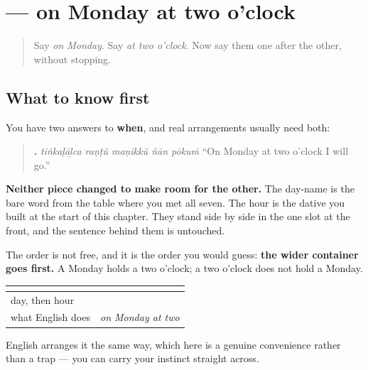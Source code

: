 \section[\texorpdfstring{\ml{തിങ്കളാഴ്ച} \ml{രണ്ട്} \ml{മണിക്ക്} (tiṅkaḷāḻca raṇṭŭ …)}{തിങ്കളാഴ്ച രണ്ട് മണിക്ക് (tiṅkaḷāḻca raṇṭŭ …)}]{   — on Monday at two o'clock}

\label{lesson:ML-C102-day-and-hour}



\begin{quote}
Say \emph{on Monday}. Say \emph{at two o'clock}. Now say them one after the other, without stopping.
\end{quote}

\subsection*{What to know first}
You have two answers to \textbf{when}, and real arrangements usually need both:

\begin{quote}
\textbf{    .} \emph{tiṅkaḷāḻca raṇṭŭ maṇikkŭ ñān pōkuṁ} \textquotedblleft{}On Monday at two o'clock I will go.\textquotedblright{}
\end{quote}

\textbf{Neither piece changed to make room for the other.} The day-name is the bare word from the table where you met all seven. The hour is the dative you built at the start of this chapter. They stand side by side in the one slot at the front, and the sentence behind them is untouched.

\begin{grammarlens}[title={Grammar Lens: wider first}]
The order is not free, and it is the order you would guess: \textbf{the wider container goes first.} A Monday holds a two o'clock; a two o'clock does not hold a Monday.

\noindent
\begin{tabularx}{\linewidth}{@{}>{\raggedright\arraybackslash}X>{\raggedright\arraybackslash}X@{}}
\toprule
\textbf{} & \textbf{} \\
\midrule
day, then hour & \textbf{\ml{തിങ്കളാഴ്ച} \ml{രണ്ട്} \ml{മണിക്ക്}} \\
what English does & \emph{on Monday at two} \\
\bottomrule
\end{tabularx}

English arranges it the same way, which here is a genuine convenience rather than a trap — you can carry your instinct straight across.
\end{grammarlens}

